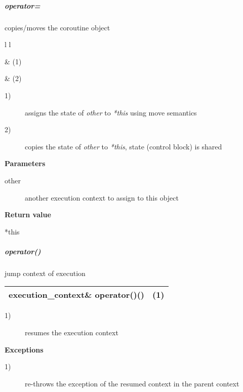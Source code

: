 \subparagraph*{operator=}
copies/moves the coroutine object\\

\begin{tabular}{ l l }
    \midrule

     & (1)\\

    \midrule

     & (2)\\

    \midrule
\end{tabular}

\begin{description}
    \item[1)] assigns the state of \emph{other} to \emph{*this} using move semantics
    \item[2)] copies the state of \emph{other} to \emph{*this}, state (control block)
              is shared
\end{description}

{\bfseries Parameters}
\begin{description}
    \item[other]   another execution context to assign to this object\\
\end{description}

{\bfseries Return value}
\begin{description}
    \item[*this]
\end{description}

\subparagraph*{operator()}
jump context of execution\\

\begin{tabular}{ l l }
    \midrule

    {\ttfamily\small\color{black}execution\_context\& {\color{blue}operator}()()} & (1)\\

    \midrule
\end{tabular}

\begin{description}
    \item[1)] resumes the execution context\\
\end{description}

{\bfseries Exceptions}
\begin{description}
    \item[1)] re-throws the exception of the resumed context in the parent context\\
\end{description}

